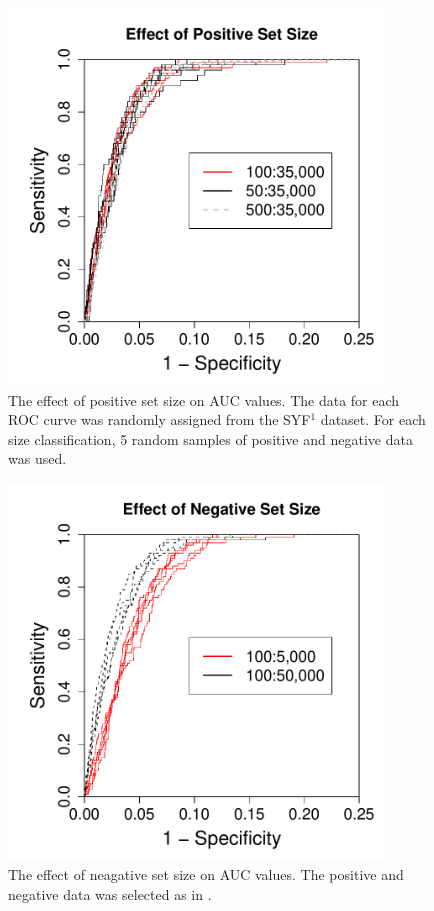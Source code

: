 \begin{figure}[htp]
\centering
\includegraphics[width=10cm]{./Figures/chapter4/effectSizePositive}
\caption[The effect of positive set size]{The effect of positive set size on AUC values. The data for each ROC curve was randomly assigned from the SYF$^1$ dataset. For each size classification, 5 random samples of positive and negative data was used.}
\label{chapter4/figureEffectPos}
\end{figure}

\begin{figure}[htp]
\centering
\includegraphics[width=10cm]{./Figures/chapter4/effectSizeNegative}
\caption[The effect of negative set size]{The effect of neagative set size on AUC values. The positive and negative data was selected as in .}
\label{chapter4/figureEffectNeg}
\end{figure}

